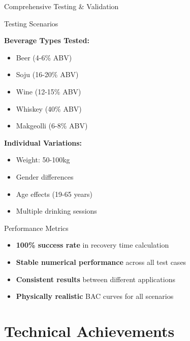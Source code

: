 \documentclass[aspectratio=169]{beamer}
\newcommand{\highlight}[1]{\textcolor{kentech_orange}{\textbf{#1}}}
\begin{document}
\begin{frame}{Comprehensive Testing \& Validation}
    \begin{block}{Testing Scenarios}
        \begin{multicols}{2}
            \textbf{Beverage Types Tested:}
            \begin{itemize}
                \item Beer (4-6\% ABV)
                \item Soju (16-20\% ABV)
                \item Wine (12-15\% ABV)
                \item Whiskey (40\% ABV)
                \item Makgeolli (6-8\% ABV)
            \end{itemize}
            
            \textbf{Individual Variations:}
            \begin{itemize}
                \item Weight: 50-100kg
                \item Gender differences
                \item Age effects (19-65 years)
                \item Multiple drinking sessions
            \end{itemize}
        \end{multicols}
    \end{block}
    
    \begin{block}{Performance Metrics}
        \begin{itemize}
            \item \highlight{100\% success rate} in recovery time calculation
            \item \highlight{Stable numerical performance} across all test cases
            \item \highlight{Consistent results} between different applications
            \item \highlight{Physically realistic} BAC curves for all scenarios
        \end{itemize}
    \end{block}
\end{frame}

\section{Technical Achievements}
\end{document}

